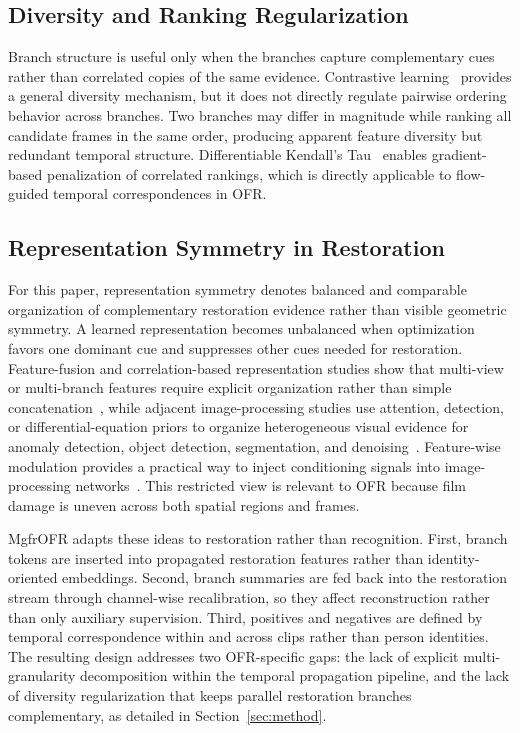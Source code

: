 \documentclass[symmetry,article,submit,pdftex,moreauthors]{Definitions/mdpi}
\begin{document}
\subsection{Diversity and Ranking Regularization}
\label{subsec:diversity_ranking}

Branch structure is useful only when the branches capture complementary cues rather than correlated copies of the same evidence. Contrastive learning~\cite{chen2020mocov2} provides a general diversity mechanism, but it does not directly regulate pairwise ordering behavior across branches. Two branches may differ in magnitude while ranking all candidate frames in the same order, producing apparent feature diversity but redundant temporal structure. Differentiable Kendall's Tau~\cite{zheng2023diffkendall} enables gradient-based penalization of correlated rankings, which is directly applicable to flow-guided temporal correspondences in OFR.

\subsection{Representation Symmetry in Restoration}
\label{subsec:symmetry_ai}

For this paper, representation symmetry denotes balanced and comparable organization of complementary restoration evidence rather than visible geometric symmetry. A learned representation becomes unbalanced when optimization favors one dominant cue and suppresses other cues needed for restoration. Feature-fusion and correlation-based representation studies show that multi-view or multi-branch features require explicit organization rather than simple concatenation~\cite{yu2021multiview_tensor_fusion,qian2020multiview_matrix_correlation}, while adjacent image-processing studies use attention, detection, or differential-equation priors to organize heterogeneous visual evidence for anomaly detection, object detection, segmentation, and denoising~\cite{cui2024video_anomaly_iqa_attention,yin2024improved_faster_rcnn,tian2020pde_segmentation_denoising}. Feature-wise modulation provides a practical way to inject conditioning signals into image-processing networks~\cite{perez2018film}. This restricted view is relevant to OFR because film damage is uneven across both spatial regions and frames.

MgfrOFR adapts these ideas to restoration rather than recognition. First, branch tokens are inserted into propagated restoration features rather than identity-oriented embeddings. Second, branch summaries are fed back into the restoration stream through channel-wise recalibration, so they affect reconstruction rather than only auxiliary supervision. Third, positives and negatives are defined by temporal correspondence within and across clips rather than person identities. The resulting design addresses two OFR-specific gaps: the lack of explicit multi-granularity decomposition within the temporal propagation pipeline, and the lack of diversity regularization that keeps parallel restoration branches complementary, as detailed in Section~\ref{sec:method}.
\end{document}
